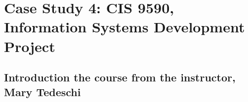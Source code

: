 \documentclass[acmlarge,timestamp]{acmart}
\begin{document}



\section{Case Study 4: CIS 9590, Information Systems Development Project}

\subsection{Introduction the course from the instructor, Mary Tedeschi}

\end{document}
